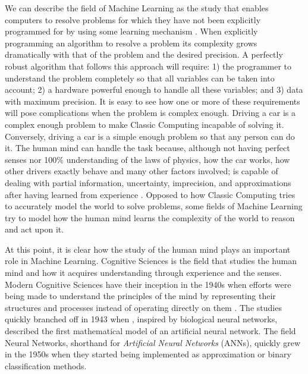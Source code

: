 We can describe the field of Machine Learning as the study that enables computers to resolve problems for which they have not been explicitly programmed for by using some learning mechanism \citet{Samuel1959}.
When explicitly programming an algorithm to resolve a problem its complexity grows dramatically with that of the problem and the desired precision.
A perfectly robust algorithm that follows this approach will require: 1) the programmer to understand the problem completely so that all variables can be taken into account; 2) a hardware powerful enough to handle all these variables; and 3) data with maximum precision.
It is easy to see how one or more of these requirements will pose complications when the problem is complex enough.
Driving a car is a complex enough problem to make Classic Computing incapable of solving it.
Conversely, driving a car is a simple enough problem so that any person can do it.
The human mind can handle the task because, although not having perfect senses nor 100\% understanding of the laws of physics, how the car works, how other drivers exactly behave and many other factors involved; is capable of dealing with partial information, uncertainty, imprecision, and approximations after having learned from experience \cite{Zadeh1994}.
Opposed to how Classic Computing tries to accurately model the world to solve problems, some fields of Machine Learning try to model how the human mind learns the complexity of the world to reason and act upon it.

At this point, it is clear how the study of the human mind plays an important role in Machine Learning.
Cognitive Sciences is the field that studies the human mind and how it acquires understanding through experience and the senses.
Modern Cognitive Sciences have their inception in the 1940s when efforts were being made to understand the principles of the mind by representing their structures and processes instead of operating directly on them \cite{Thagard2008}.
The studies quickly branched off in 1943 when \citet{McCulloch1943}, inspired by biological neural networks, described the first mathematical model of an artificial neural network.
The field Neural Networks, shorthand for \emph{Artificial Neural Networks} (ANNs), quickly grew in the 1950s when they started being implemented \cite{Farley1954,Rosenblatt1958} as approximation or binary classification methods.


